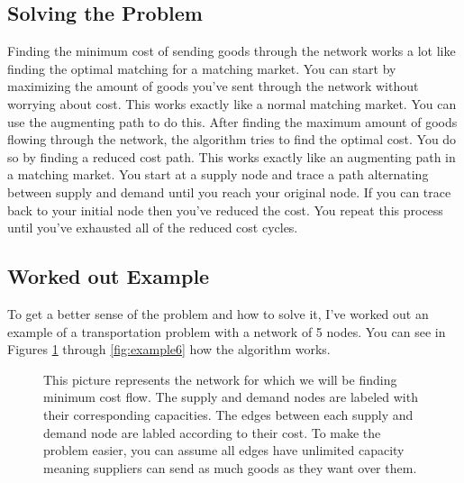 \documentclass{report}
\begin{document}
\subsection{Solving the Problem}

Finding the minimum cost of sending goods through the network works a lot like finding the optimal matching for a matching market. You can start by maximizing the amount of goods you've sent through the network without worrying about cost. This works exactly like a normal matching market. You can use the augmenting path to do this. After finding the maximum amount of goods flowing through the network, the algorithm tries to find the optimal cost. You do so by finding a reduced cost path. This works exactly like an augmenting path in a matching market. You start at a supply node and trace a path alternating between supply and demand until you reach your original node. If you can trace back to your initial node then you've reduced the cost. You repeat this process until you've exhausted all of the reduced cost cycles.


\subsection{Worked out Example}

To get a better sense of the problem and how to solve it, I've worked out an example of a transportation problem with a network of 5 nodes. You can see in Figures \ref{fig:example1} through \ref{fig:example6} how the algorithm works.

\begin{figure}
\centering
\begin{framed}
\caption{This picture represents the network for which we will be finding minimum cost flow. The supply and demand nodes are labeled with their corresponding capacities.  The edges between each supply and demand node are labled according to their cost. To make the problem easier, you can assume all edges have unlimited capacity meaning suppliers can send as much goods as they want over them.}
\label{fig:example1}
\end{framed}
\end{figure}
\end{document}
